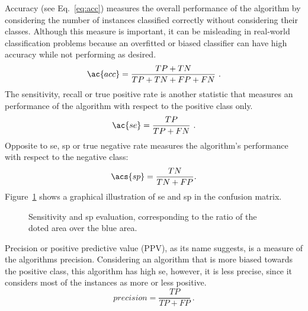 Accuracy (see Eq.~\ref{eq:acc}) measures the overall performance of the algorithm by considering the number of instances classified correctly without considering their classes.
Although this measure is important, it can be misleading in real-world classification problems because an overfitted or biased classifier can have high accuracy while not performing as desired.
\begin{equation}
\ac{acc} = \frac{TP+TN}{TP+TN+FP+FN}~.
\label{eq:acc}
\end{equation} 
The sensitivity, recall or true positive rate is another statistic that measures an performance of the algorithm with respect to the positive class only.
\begin{equation}
\ac{se}	 = \frac{TP}{TP+FN}~.
\label{eq:se}
\end{equation}
Opposite to \ac{se}, \acl{sp} or true negative rate measures the algorithm's performance with respect to the negative class:
\begin{equation}
\acs{sp} = \frac{TN}{TN+FP}.
\label{eq:sp}
\end{equation}
Figure~\ref{fig:sesp} shows a graphical illustration of \ac{se} and \ac{sp} in the confusion matrix.
\begin{figure}
 \def\myRadius{.65cm}
 \def\vennSpace{(0,0) rectangle (2.6cm,1.6cm)}
 \def\predictedCircle{(.8cm,.8cm) circle (\myRadius)}
 \def\actualCircle{(1.8cm,.8cm) circle (\myRadius)}
 \def\myLabelRadius{.450cm}
  
\centering
{}
    
\caption[Sensitivity and Specificity]{Sensitivity and \acl{sp} evaluation, corresponding to the ratio of the doted area over the blue area.}
\label{fig:sesp}
\end{figure}

Precision or positive predictive value (PPV), as its name suggests, is a measure of the algorithms precision.
Considering an algorithm that is more biased towards the positive class, this algorithm has high \ac{se}, however, it is less precise, since it considers most of the instances as more or less positive.
\begin{equation}
precision = \frac{TP}{TP+FP}~.
\label{eq:ppv}
\end{equation} 

